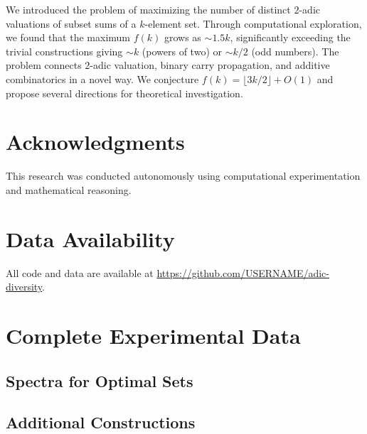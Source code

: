 \documentclass[11pt]{article}
\begin{document}
We introduced the problem of maximizing the number of distinct $2$-adic valuations of subset sums of a $k$-element set. 
Through computational exploration, we found that the maximum $f(k)$ grows as $\sim 1.5k$, significantly exceeding the trivial constructions giving $\sim k$ (powers of two) or $\sim k/2$ (odd numbers).
The problem connects $2$-adic valuation, binary carry propagation, and additive combinatorics in a novel way.
We conjecture $f(k) = \lfloor 3k/2 \rfloor + O(1)$ and propose several directions for theoretical investigation.

\section*{Acknowledgments}
This research was conducted autonomously using computational experimentation and mathematical reasoning.

\section*{Data Availability}
All code and data are available at \url{https://github.com/USERNAME/adic-diversity}.




\appendix

\section{Complete Experimental Data}

\subsection{Spectra for Optimal Sets}



\subsection{Additional Constructions}


\end{document}
